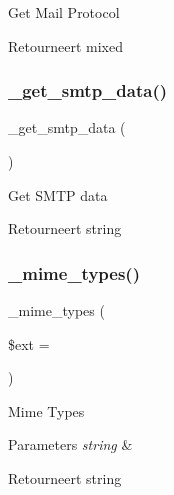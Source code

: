 Get Mail Protocol

\begin{DoxyReturn}{Retourneert}
mixed 
\end{DoxyReturn}
\mbox{\label{class_c_i___email_ac421324c92e681315a1f2d0d7fa96a5b}} 
\subsubsection{\texorpdfstring{\_get\_smtp\_data()}{\_get\_smtp\_data()}}
{\footnotesize\ttfamily \+\_\+get\+\_\+smtp\+\_\+data (\begin{DoxyParamCaption}{ }\end{DoxyParamCaption})\hspace{0.3cm}{\ttfamily [protected]}}

Get S\+M\+TP data

\begin{DoxyReturn}{Retourneert}
string 
\end{DoxyReturn}
\mbox{\label{class_c_i___email_a7581ef570bb25b483e80ee996c42e454}} 
\subsubsection{\texorpdfstring{\_mime\_types()}{\_mime\_types()}}
{\footnotesize\ttfamily \+\_\+mime\+\_\+types (\begin{DoxyParamCaption}\item[{}]{\$ext = {\ttfamily \textquotesingle{}\textquotesingle{}} }\end{DoxyParamCaption})\hspace{0.3cm}{\ttfamily [protected]}}

Mime Types


\begin{DoxyParams}{Parameters}
{\em string} & \\
\hline
\end{DoxyParams}
\begin{DoxyReturn}{Retourneert}
string 
\end{DoxyReturn}
\mbox{\label{class_c_i___email_a56a4d842c3dfe77bcb41082a82c5df24}} 
